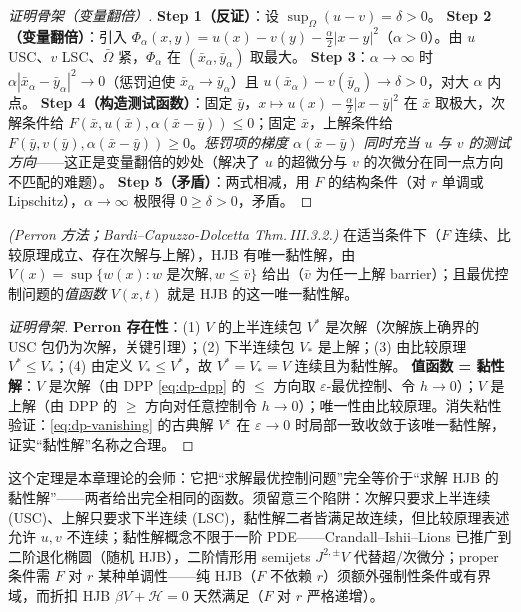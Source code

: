 \begin{proof}[证明骨架（变量翻倍）]
\textbf{Step 1（反证）}：设 $\sup_\Omega(u-v)=\delta>0$。
\textbf{Step 2（变量翻倍）}：引入 $\Phi_\alpha(x,y)=u(x)-v(y)-\tfrac\alpha2|x-y|^2$（$\alpha>0$）。由 $u$ USC、$v$ LSC、$\bar\Omega$ 紧，$\Phi_\alpha$ 在 $(\bar x_\alpha,\bar y_\alpha)$ 取最大。
\textbf{Step 3}：$\alpha\to\infty$ 时 $\alpha|\bar x_\alpha-\bar y_\alpha|^2\to0$（惩罚迫使 $\bar x_\alpha\to\bar y_\alpha$）且 $u(\bar x_\alpha)-v(\bar y_\alpha)\to\delta>0$，对大 $\alpha$ 内点。
\textbf{Step 4（构造测试函数）}：固定 $\bar y$，$x\mapsto u(x)-\tfrac\alpha2|x-\bar y|^2$ 在 $\bar x$ 取极大，次解条件给 $F(\bar x,u(\bar x),\alpha(\bar x-\bar y))\le0$；固定 $\bar x$，上解条件给 $F(\bar y,v(\bar y),\alpha(\bar x-\bar y))\ge0$。\emph{惩罚项的梯度 $\alpha(\bar x-\bar y)$ 同时充当 $u$ 与 $v$ 的测试方向}——这正是变量翻倍的妙处（解决了 $u$ 的超微分与 $v$ 的次微分在同一点方向不匹配的难题）。
\textbf{Step 5（矛盾）}：两式相减，用 $F$ 的结构条件（对 $r$ 单调或 Lipschitz），$\alpha\to\infty$ 极限得 $0\ge\delta>0$，矛盾。
\end{proof}

\begin{theorem}[Perron 存在性 + 值函数 = 唯一黏性解]\label{thm:dp-perron}
\emph{(Perron 方法；Bardi--Capuzzo-Dolcetta Thm.\,III.3.2\cite{bardi1997optimal}.)} 在适当条件下（$F$ 连续、比较原理成立、存在次解与上解），HJB 有唯一黏性解，由 $V(x)=\sup\{w(x):w\text{ 是次解},w\le\bar v\}$ 给出（$\bar v$ 为任一上解 barrier）；且最优控制问题的\emph{值函数} $V(x,t)$ 就是 HJB 的这一唯一黏性解。
\end{theorem}

\begin{proof}[证明骨架]
\textbf{Perron 存在性}：(1) $V$ 的上半连续包 $V^*$ 是次解（次解族上确界的 USC 包仍为次解，关键引理）；(2) 下半连续包 $V_*$ 是上解；(3) 由比较原理 $V^*\le V_*$；(4) 由定义 $V_*\le V^*$，故 $V^*=V_*=V$ 连续且为黏性解。
\textbf{值函数 = 黏性解}：$V$ 是次解（由 DPP \cref{eq:dp-dpp} 的 $\le$ 方向取 $\varepsilon$-最优控制、令 $h\to0$）；$V$ 是上解（由 DPP 的 $\ge$ 方向对任意控制令 $h\to0$）；唯一性由比较原理。消失粘性验证：\cref{eq:dp-vanishing} 的古典解 $V^\varepsilon$ 在 $\varepsilon\to0$ 时局部一致收敛于该唯一黏性解，证实“黏性解”名称之合理。
\end{proof}

这个定理是本章理论的会师：它把“求解最优控制问题”完全等价于“求解 HJB 的黏性解”——两者给出完全相同的函数。须留意三个陷阱：次解只要求上半连续 (USC)、上解只要求下半连续 (LSC)，黏性解二者皆满足故连续，但比较原理表述允许 $u,v$ 不连续；黏性解概念不限于一阶 PDE——Crandall--Ishii--Lions 已推广到二阶退化椭圆（随机 HJB），二阶情形用 semijets $J^{2,\pm}V$ 代替超/次微分；proper 条件需 $F$ 对 $r$ 某种单调性——纯 HJB（$F$ 不依赖 $r$）须额外强制性条件或有界域，而折扣 HJB $\beta V+\mathcal H=0$ 天然满足（$F$ 对 $r$ 严格递增）。

